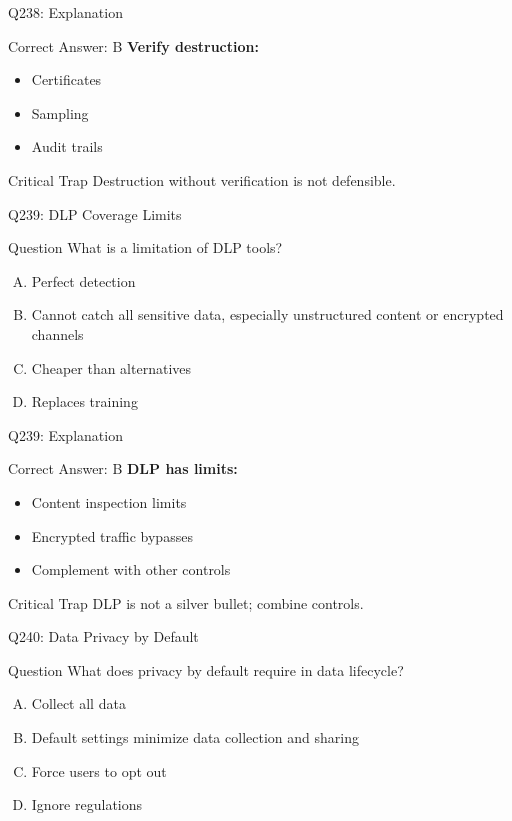 \documentclass{beamer}
\begin{document}
	\begin{frame}{Q238: Explanation}
		\begin{block}{Correct Answer: B}
			\textbf{Verify destruction:}
			\begin{itemize}
				\item Certificates
				\item Sampling
				\item Audit trails
			\end{itemize}
		\end{block}
		\begin{alertblock}{Critical Trap}
			Destruction without verification is not defensible.
		\end{alertblock}
	\end{frame}
	
	\begin{frame}{Q239: DLP Coverage Limits}
		\begin{block}{Question}
			What is a limitation of DLP tools?
		\end{block}
		\begin{enumerate}[(A)]
			\item Perfect detection
			\item Cannot catch all sensitive data, especially unstructured content or encrypted channels
			\item Cheaper than alternatives
			\item Replaces training
		\end{enumerate}
	\end{frame}
	
	\begin{frame}{Q239: Explanation}
		\begin{block}{Correct Answer: B}
			\textbf{DLP has limits:}
			\begin{itemize}
				\item Content inspection limits
				\item Encrypted traffic bypasses
				\item Complement with other controls
			\end{itemize}
		\end{block}
		\begin{alertblock}{Critical Trap}
			DLP is not a silver bullet; combine controls.
		\end{alertblock}
	\end{frame}
	
	\begin{frame}{Q240: Data Privacy by Default}
		\begin{block}{Question}
			What does privacy by default require in data lifecycle?
		\end{block}
		\begin{enumerate}[(A)]
			\item Collect all data
			\item Default settings minimize data collection and sharing
			\item Force users to opt out
			\item Ignore regulations
		\end{enumerate}
	\end{frame}
	
\end{document}
